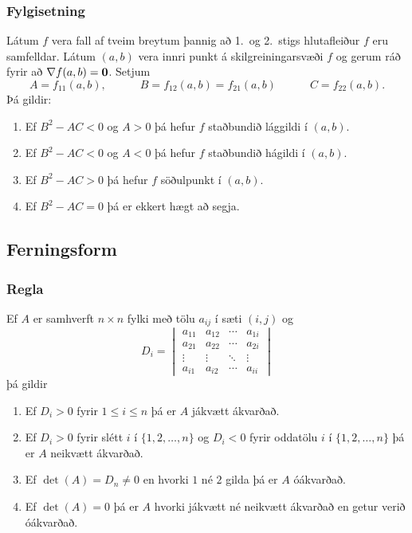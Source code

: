 \subsubsection{Fylgisetning  }
Látum $f$ vera fall af tveim breytum þannig að
1.~og 2.~stigs hlutafleiður $f$ eru samfelldar.  Látum $(a,b)$ vera
innri punkt á skilgreiningarsvæði $f$ og gerum ráð fyrir að $\nabla
f(a,b)=\mbox{${\bf 0}$}$.  Setjum 
$$A=f_{11}(a,b),\qquad\quad B=f_{12}(a,b)=f_{21}(a,b)\qquad\quad
C=f_{22}(a,b).$$ 
Þá gildir:
\begin {enumerate}
 \item  Ef $B^2-AC<0$ og $A>0$  þá hefur $f$
     staðbundið lággildi í $(a,b)$.
 \item  Ef $B^2-AC<0$ og $A<0$ 
 þá hefur $f$ staðbundið
hágildi í $(a,b)$.
 \item   Ef $B^2-AC>0$ 
þá hefur $f$ söðulpunkt í
      $(a,b)$.  
 \item  Ef $B^2-AC=0$ þá er ekkert hægt að segja.  
\end {enumerate}



 
\subsection{Ferningsform}  

\subsubsection{Regla  }
Ef $A$ er samhverft $n \times n$ fylki með tölu $a_{ij}$ í sæti $(i,j)$ og
\begin {equation*}
 D_i = \begin{vmatrix}
        a_{11} & a_{12} & \cdots & a_{1i} \\
        a_{21} & a_{22} & \cdots & a_{2i} \\
        \vdots & \vdots & \ddots & \vdots \\ 
        a_{i1} & a_{i2} & \cdots & a_{ii} 
       \end{vmatrix}
\end {equation*}
þá gildir
\begin {enumerate}
 \item Ef $D_i > 0$ fyrir $1\leq i \leq n$ þá er $A$ jákvætt ákvarðað.
 \item Ef $D_i > 0$ fyrir slétt $i$ í $\{1,2,\ldots,n\}$ og $D_i < 0$ fyrir oddatölu $i$ í $\{1,2,\ldots,n\}$ þá er $A$ neikvætt ákvarðað.
 \item Ef $\det(A) = D_n \neq 0$ en hvorki $1$ né $2$ gilda þá er $A$ óákvarðað. 
 \item Ef $\det(A) = 0$ þá er $A$ hvorki jákvætt né neikvætt ákvarðað en getur verið óákvarðað.
\end {enumerate}




